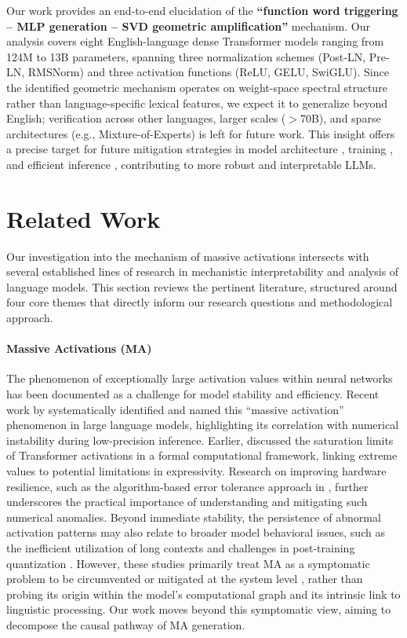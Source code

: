 \documentclass[conference]{IEEEtran}
\begin{document}
Our work provides an end-to-end elucidation of the \textbf{``function word triggering -- MLP generation -- SVD geometric amplification''} mechanism. Our analysis covers eight English-language dense Transformer models ranging from 124M to 13B parameters, spanning three normalization schemes (Post-LN, Pre-LN, RMSNorm) and three activation functions (ReLU, GELU, SwiGLU). Since the identified geometric mechanism operates on weight-space spectral structure rather than language-specific lexical features, we expect it to generalize beyond English; verification across other languages, larger scales ($>$70B), and sparse architectures (e.g., Mixture-of-Experts) is left for future work. This insight offers a precise target for future mitigation strategies in model architecture \cite{nagarajan2025creative}, training \cite{kim2025train, ouyang2022training}, and efficient inference \cite{dong2024flashattention2}, contributing to more robust and interpretable LLMs.


\section{Related Work}
Our investigation into the mechanism of massive activations intersects with several established lines of research in mechanistic interpretability and analysis of language models. This section reviews the pertinent literature, structured around four core themes that directly inform our research questions and methodological approach.

\paragraph{Massive Activations (MA)} The phenomenon of exceptionally large activation values within neural networks has been documented as a challenge for model stability and efficiency. Recent work by \cite{dao2024massive} systematically identified and named this “massive activation” phenomenon in large language models, highlighting its correlation with numerical instability during low-precision inference. Earlier, \cite{merrill2022saturated} discussed the saturation limits of Transformer activations in a formal computational framework, linking extreme values to potential limitations in expressivity. Research on improving hardware resilience, such as the algorithm-based error tolerance approach in \cite{liu2025alberta}, further underscores the practical importance of understanding and mitigating such numerical anomalies. Beyond immediate stability, the persistence of abnormal activation patterns may also relate to broader model behavioral issues, such as the inefficient utilization of long contexts \cite{fu2023lost} and challenges in post-training quantization \cite{li2024understanding}. However, these studies primarily treat MA as a symptomatic problem to be circumvented or mitigated at the system level \cite{schwartz2021measuring}, rather than probing its origin within the model's computational graph and its intrinsic link to linguistic processing. Our work moves beyond this symptomatic view, aiming to decompose the causal pathway of MA generation.
\end{document}
